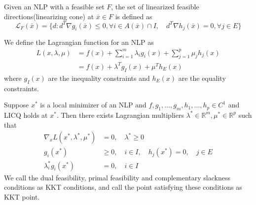\begin{definition}
    Given an NLP with a feasible set $F$, the set of linearized feasible directions(linearizing cone) at $\bar x \in F$ is defined as 
    $$\mathcal L_F(\bar x) = \{d: d^T \nabla g_i(\bar x) \leq 0, \forall i \in A(\bar x) \cap I, \quad d^T \nabla h_j(\bar x) = 0, \forall j \in E\}$$
\end{definition}
\begin{definition}
    We define the Lagrangian function for an NLP as 
    \begin{align*}
        L(x, \lambda, \mu) &= f(x) + \sum_{i=1}^m \lambda_i g_i(x) + \sum_{j=1}^p \mu_j h_j(x) \\
        &= f(x) + \lambda^T g_I(x) + \mu^T h_E(x)
    \end{align*}
    where $g_I(x)$ are the inequality constraints and $h_E(x)$ are the equality constraints.
\end{definition}
\begin{theorem}
    Suppose $x^*$ is a local minimizer of an NLP and $f,g_1,\ldots,g_m,h_1,\ldots,h_p \in C^1$ and LICQ holds at $x^*$. Then there exists Lagrangian multipliers $\lambda^* \in \mathbb R^m, \mu^* \in \mathbb R^p$ such that
    \begin{align*}
        \nabla_x L(x^*, \lambda^*, \mu^*) &= 0, \quad \lambda^* \geq 0 \tag*{Dual feasibility} \\
        g_i(x^*) &\geq 0, \quad i \in I, \quad h_j(x^*) = 0, \quad j \in E \tag*{Primal feasibility} \\
        \lambda^*_i g_i(x^*) &= 0, \quad i \in I \tag*{Complementary slackness}
    \end{align*}
    We call the dual feasibility, primal feasibility and complementary slackness conditions as KKT conditions, and call the point satisfying these conditions as KKT point.
\end{theorem}
